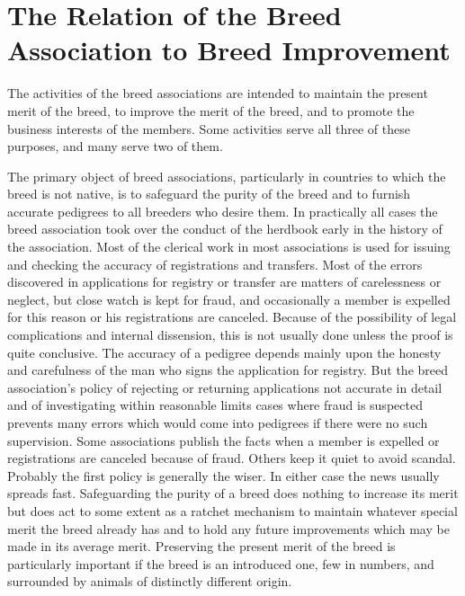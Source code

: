 \chapter{The Relation of the Breed Association to Breed Improvement}
\label{cha:relationship-breed-association-breed-improvement}

The activities of the breed associations are intended to maintain the present merit of the breed, to improve the merit of the breed, and to promote the business interests of the members. Some activities serve all three of these purposes, and many serve two of them.

The primary object of breed associations, particularly in countries to which the breed is not native, is to safeguard the 
purity of the breed and to furnish accurate pedigrees to all breeders who desire them. In practically all cases the breed 
association took over the conduct of the herdbook early in the history of the association. Most of the clerical work in 
most associations is used for issuing and checking the accuracy of registrations and transfers. Most of the errors 
discovered in applications for registry or transfer are matters of carelessness or neglect, but close watch is kept for 
fraud, and occasionally a member is expelled for this reason or his registrations are canceled. Because of the possibility
of legal complications and internal dissension, this is not usually done unless the proof is quite conclusive. The accuracy 
of a pedigree depends mainly upon the honesty and carefulness of the man who signs the application for registry. But the 
breed association's policy of rejecting or returning applications not accurate in detail and of investigating within 
reasonable limits cases where fraud is suspected prevents many errors which would come into pedigrees if there were no such 
supervision. Some associations publish the facts when a member is expelled or registrations are canceled because of fraud. 
Others keep it quiet to avoid scandal. Probably the first policy is generally the wiser. In either case the news usually 
spreads fast. Safeguarding the purity of a breed does nothing to increase its merit but does act to some extent as a ratchet
mechanism to maintain whatever special merit the breed already has and to hold any future improvements which may be made in 
its average merit. Preserving the present merit of the breed is particularly important if the breed is an introduced one, 
few in numbers, and surrounded by animals of distinctly different origin.

